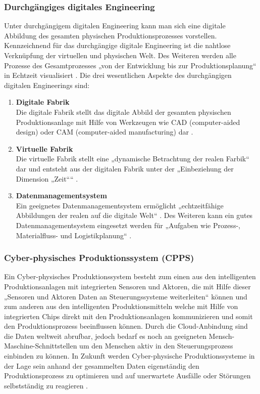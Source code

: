 \subsubsection{Durchgängiges digitales Engineering}\label{sec:DigitalesEngineering}
Unter durchgängigem digitalen Engineering kann man sich eine digitale Abbildung des gesamten physischen Produktionsprozesses vorstellen. Kennzeichnend für das durchgängige digitale Engineering ist die nahtlose Verknüpfung der virtuellen und physischen Welt. Des Weiteren werden alle Prozesse des Gesamtprozesses „von der Entwicklung bis zur Produktionsplanung“ \cite[S.41]{14} in Echtzeit visualisiert \cite[S.41]{14}.
\newline\newline
Die drei wesentlichen Aspekte des durchgängigen digitalen Engineerings sind:
\begin{enumerate}
	\item \textbf{Digitale Fabrik} \\ 
	Die digitale Fabrik stellt das digitale Abbild der gesamten physischen Produktionsanlage mit Hilfe von Werkzeugen wie CAD (computer-aided design) oder CAM (computer-aided manufacturing) dar \cite[S.41]{14}.
	\item \textbf{Virtuelle Fabrik} \\
	Die virtuelle Fabrik stellt eine „dynamische Betrachtung der realen Farbik“ \cite[S.41]{14} dar und entsteht aus der digitalen Fabrik unter der „Einbeziehung der Dimension „Zeit““ \cite[S.41]{14}.
	\item \textbf{Datenmanagementsystem} \\
	Ein geeignetes Datenmanagementsystem ermöglicht „echtzeitfähige Abbildungen der realen auf die digitale Welt“ \cite[S.41]{14}. Des Weiteren kann ein gutes Datenmanagementsystem eingesetzt werden für „Aufgaben wie Prozess-, Materialfluss- und Logistikplanung“ \cite[S.41]{14}.
\end{enumerate}

\subsubsection{Cyber-physisches Produktionssystem (CPPS)}\label{sec:CPPS}
Ein Cyber-physisches Produktionssystem besteht zum einen aus den intelligenten Produktionsanlagen mit integrierten Sensoren und Aktoren, die mit Hilfe dieser „Sensoren und Aktoren Daten an Steuerungssysteme weiterleiten“ \cite[S.42]{14} können und zum anderen aus den intelligenten Produktionsmitteln welche mit Hilfe von integrierten Chips direkt mit den Produktionsanlagen kommunizieren und somit den Produktionsprozess beeinflussen können. Durch die Cloud-Anbindung sind die Daten weltweit abrufbar, jedoch bedarf es noch an geeigneten Mensch-Maschine-Schnittstellen um den Menschen aktiv in den Steuerungsprozess einbinden zu können. In Zukunft werden Cyber-physische Produktionssysteme in der Lage sein anhand der gesammelten Daten eigenständig den Produktionsprozess zu optimieren und auf unerwartete Ausfälle oder Störungen selbstständig zu reagieren \cite[S.42]{14}.

